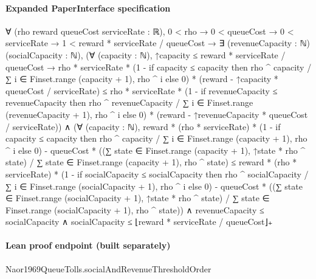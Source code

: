 \documentclass[10pt]{article}
\begin{document}
\paragraph{Expanded PaperInterface specification}
\begin{ReviewVerbatim}
∀ (rho reward queueCost serviceRate : ℝ),
  0 < rho →
    0 < queueCost →
      0 < serviceRate →
        1 < reward * serviceRate / queueCost →
          ∃ (revenueCapacity : ℕ) (socialCapacity : ℕ),
            (∀ (capacity : ℕ),
                ↑capacity ≤ reward * serviceRate / queueCost →
                  rho * serviceRate *
                        (1 -
                          if capacity ≤ capacity then rho ^ capacity / ∑ i ∈ Finset.range (capacity + 1), rho ^ i
                          else 0) *
                      (reward - ↑capacity * queueCost / serviceRate) ≤
                    rho * serviceRate *
                        (1 -
                          if revenueCapacity ≤ revenueCapacity then
                            rho ^ revenueCapacity / ∑ i ∈ Finset.range (revenueCapacity + 1), rho ^ i
                          else 0) *
                      (reward - ↑revenueCapacity * queueCost / serviceRate)) ∧
              (∀ (capacity : ℕ),
                  reward * (rho * serviceRate) *
                        (1 -
                          if capacity ≤ capacity then rho ^ capacity / ∑ i ∈ Finset.range (capacity + 1), rho ^ i
                          else 0) -
                      queueCost *
                        ((∑ state ∈ Finset.range (capacity + 1), ↑state * rho ^ state) /
                          ∑ state ∈ Finset.range (capacity + 1), rho ^ state) ≤
                    reward * (rho * serviceRate) *
                        (1 -
                          if socialCapacity ≤ socialCapacity then
                            rho ^ socialCapacity / ∑ i ∈ Finset.range (socialCapacity + 1), rho ^ i
                          else 0) -
                      queueCost *
                        ((∑ state ∈ Finset.range (socialCapacity + 1), ↑state * rho ^ state) /
                          ∑ state ∈ Finset.range (socialCapacity + 1), rho ^ state)) ∧
                revenueCapacity ≤ socialCapacity ∧ socialCapacity ≤ ⌊reward * serviceRate / queueCost⌋₊
\end{ReviewVerbatim}



\paragraph{Lean proof endpoint (built separately)}\begin{ReviewVerbatim}
Naor1969QueueTolls.socialAndRevenueThresholdOrder
\end{ReviewVerbatim}
\end{document}
